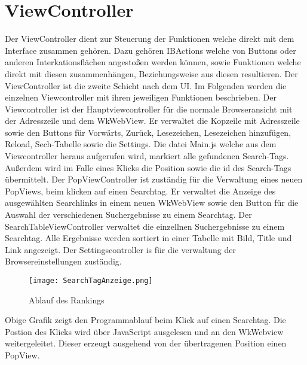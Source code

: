 
\section{ViewController}
Der ViewController dient zur Steuerung der Funktionen welche direkt mit dem Interface zusammen gehören. Dazu gehören
IBActions welche von Buttons oder anderen Interkationsflächen angestoßen werden können, sowie Funktionen welche direkt mit diesen zusammenhängen, Beziehungsweise aus diesen resultieren. Der ViewController ist die zweite Schicht nach dem UI. Im
Folgenden werden die einzelnen Viewcontroller mit ihren jeweiligen Funktionen beschrieben.
Der Viewcontroller ist der Hauptviewcontroller für die normale Browseransicht mit der Adresszeile und dem WkWebView. Er verwaltet die Kopzeile mit Adresszeile sowie den Buttons für Vorwärts, Zurück, Lesezeichen, Lesezeichen hinzufügen, Reload, Sech-Tabelle sowie die Settings. Die datei Main.js welche aus dem Viewcontroller heraus aufgerufen wird, markiert alle gefundenen Search-Tags. Außerdem wird im Falle eines Klicks die Position sowie die id des Search-Tags übermittelt.
Der PopViewController ist zuständig für die Verwaltung eines neuen PopViews, beim klicken auf einen Searchtag. Er verwaltet die Anzeige des ausgewählten Searchlinks in einem neuen WkWebView sowie den Button für die Auswahl der verschiedenen Suchergebnisse zu einem Searchtag.
Der SearchTableViewController verwaltet die einzellnen Suchergebnisse zu einem Searchtag. Alle Ergebnisse werden sortiert in einer Tabelle mit Bild, Title und Link angezeigt.
Der Settingscontroller is für die verwaltung der Browsereinstellungen zuständig.

\begin{figure}[ht]
	\centering
	\texttt{[image: SearchTagAnzeige.png]}
	\caption{Ablauf des Rankings}
	\label{fig:Searchtag Anzeige}
\end{figure}

Obige Grafik zeigt den Programmablauf beim Klick auf einen Searchtag. Die Postion des Klicks wird über JavaScript ausgelesen und an den WkWebview weitergeleitet. Dieser erzeugt ausgehend von der übertragenen Position einen PopView. 
